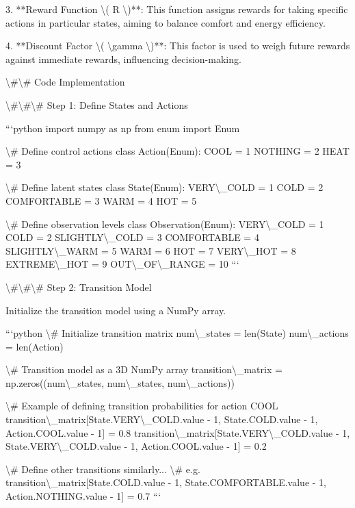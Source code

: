 \documentclass[11pt,a4paper]{article}
\begin{document}
3. **Reward Function \textbackslash{}( R \textbackslash{})**: This function assigns rewards for taking specific actions in particular states, aiming to balance comfort and energy efficiency.

4. **Discount Factor \textbackslash{}( \textbackslash{}gamma \textbackslash{})**: This factor is used to weigh future rewards against immediate rewards, influencing decision-making.

\textbackslash{}#\textbackslash{}# Code Implementation

\textbackslash{}#\textbackslash{}#\textbackslash{}# Step 1: Define States and Actions

```python
import numpy as np
from enum import Enum

\textbackslash{}# Define control actions
class Action(Enum):
    COOL = 1
    NOTHING = 2
    HEAT = 3

\textbackslash{}# Define latent states
class State(Enum):
    VERY\textbackslash{}_COLD = 1
    COLD = 2
    COMFORTABLE = 3
    WARM = 4
    HOT = 5

\textbackslash{}# Define observation levels
class Observation(Enum):
    VERY\textbackslash{}_COLD = 1
    COLD = 2
    SLIGHTLY\textbackslash{}_COLD = 3
    COMFORTABLE = 4
    SLIGHTLY\textbackslash{}_WARM = 5
    WARM = 6
    HOT = 7
    VERY\textbackslash{}_HOT = 8
    EXTREME\textbackslash{}_HOT = 9
    OUT\textbackslash{}_OF\textbackslash{}_RANGE = 10
```

\textbackslash{}#\textbackslash{}#\textbackslash{}# Step 2: Transition Model

Initialize the transition model using a NumPy array.

```python
\textbackslash{}# Initialize transition matrix
num\textbackslash{}_states = len(State)
num\textbackslash{}_actions = len(Action)

\textbackslash{}# Transition model as a 3D NumPy array
transition\textbackslash{}_matrix = np.zeros((num\textbackslash{}_states, num\textbackslash{}_states, num\textbackslash{}_actions))

\textbackslash{}# Example of defining transition probabilities for action COOL
transition\textbackslash{}_matrix[State.VERY\textbackslash{}_COLD.value - 1, State.COLD.value - 1, Action.COOL.value - 1] = 0.8
transition\textbackslash{}_matrix[State.VERY\textbackslash{}_COLD.value - 1, State.VERY\textbackslash{}_COLD.value - 1, Action.COOL.value - 1] = 0.2

\textbackslash{}# Define other transitions similarly...
\textbackslash{}# e.g. transition\textbackslash{}_matrix[State.COLD.value - 1, State.COMFORTABLE.value - 1, Action.NOTHING.value - 1] = 0.7
```
\end{document}
